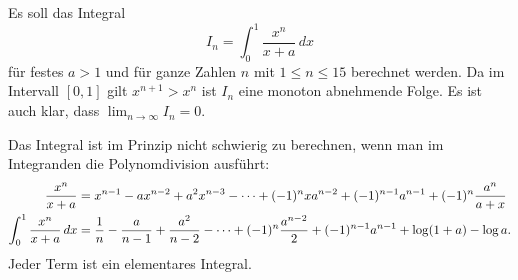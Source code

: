 \begin{beispiel}
Es soll das Integral
\[
I_n = \int_0^1 \frac{x^n}{x+a}\,dx
\]
für festes $a>1$ und für ganze Zahlen $n$ mit $1\le n\le 15$ berechnet
werden.
%
Da im Intervall $[0,1]$ gilt $x^{n+1}>x^n$ ist $I_n$ eine monoton
abnehmende Folge.
Es ist auch klar, dass $\lim_{n\to\infty}I_n=0$.

Das Integral ist im Prinzip nicht schwierig zu berechnen, wenn man im
Integranden die Polynomdivision ausführt:
%
\begin{align}
\frac{x^n}{x+a}
&=
x^{n-1} -ax^{n-2}+a^2x^{n-3}-\dots +(-1)^n xa^{n-2} +(-1)^{n-1}a^{n-1}
+(-1)^n\frac{a^n}{a+x}
\notag
\\
\int_0^1 \frac{x^n}{x+a}\,dx
&=
\frac1n
-\frac{a}{n-1}
+\frac{a^2}{n-2}
-\dots
+(-1)^n\frac{a^{n-2}}{2}
+(-1)^{n-1}a^{n-1}
+\log(1+a)-\log a.
\label{buch:numerik:instabil:summe}
\end{align}
Jeder Term ist ein elementares Integral.
\end{beispiel}

